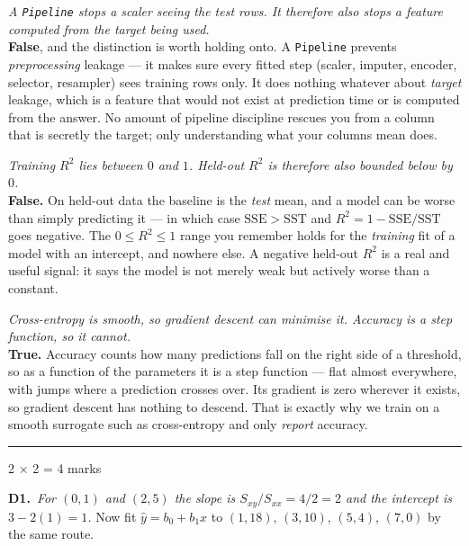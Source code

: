 \documentclass[10pt,a4paper]{article}
\newcommand{\parthead}[2]{\vspace{2pt}\noindent\rule{\linewidth}{0.4pt}\par\vspace{2pt}%
  \noindent{\bfseries Part #1}\hfill{\small #2}\par\vspace{1pt}}
\begin{document}
\begin{sC}

  \item \emph{\emph{A \texttt{Pipeline} stops a scaler seeing the test rows.} It therefore also stops a feature computed from the target being used.}\\[2pt] \textbf{False}, and the distinction is worth holding onto. A \texttt{Pipeline} prevents \emph{preprocessing} leakage --- it makes sure every fitted step (scaler, imputer, encoder, selector, resampler) sees training rows only. It does nothing whatever about \emph{target} leakage, which is a feature that would not exist at prediction time or is computed from the answer. No amount of pipeline discipline rescues you from a column that is secretly the target; only understanding what your columns mean does.

  \item \emph{\emph{Training $R^2$ lies between $0$ and $1$.} Held-out $R^2$ is therefore also bounded below by $0$.}\\[2pt] \textbf{False.} On held-out data the baseline is the \emph{test} mean, and a model can be worse than simply predicting it --- in which case $\mathrm{SSE} > \mathrm{SST}$ and $R^2 = 1 - \mathrm{SSE}/\mathrm{SST}$ goes negative. The $0 \le R^2 \le 1$ range you remember holds for the \emph{training} fit of a model with an intercept, and nowhere else. A negative held-out $R^2$ is a real and useful signal: it says the model is not merely weak but actively worse than a constant.

  \item \emph{\emph{Cross-entropy is smooth, so gradient descent can minimise it.} Accuracy is a step function, so it cannot.}\\[2pt] \textbf{True.} Accuracy counts how many predictions fall on the right side of a threshold, so as a function of the parameters it is a step function --- flat almost everywhere, with jumps where a prediction crosses over. Its gradient is zero wherever it exists, so gradient descent has nothing to descend. That is exactly why we train on a smooth surrogate such as cross-entropy and only \emph{report} accuracy.

\end{sC}

\newpage

\parthead{D --- Short answer}{2 $\times$ 2 = 4 marks}

\textbf{D1.}\ \emph{For $(0,1)$ and $(2,5)$ the slope is $S_{xy}/S_{xx} = 4/2 = 2$ and the intercept is $3 - 2(1) = 1$.} Now fit $\hat y = b_0 + b_1x$ to $(1,18)$, $(3,10)$, $(5,4)$, $(7,0)$ by the same route.
\end{document}
